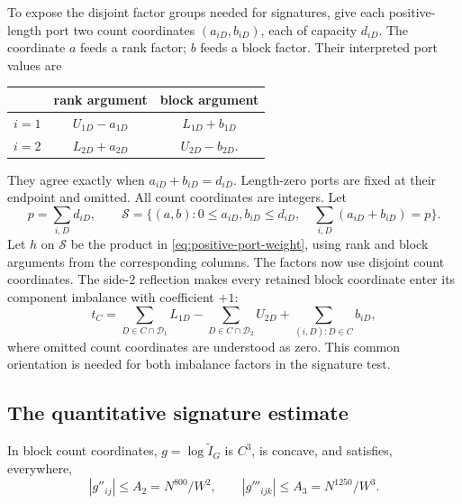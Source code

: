 To expose the disjoint factor groups needed for signatures, give each
positive-length port two count coordinates $(a_{iD},b_{iD})$, each of
capacity $d_{iD}$. The coordinate $a$ feeds a rank factor; $b$ feeds a
block factor. Their interpreted port values are
\begin{center}
\begin{tabular}{c@{\qquad}cc}
 & rank argument & block argument\\ \hline
 $i=1$ & $U_{1D}-a_{1D}$ & $L_{1D}+b_{1D}$\\
 $i=2$ & $L_{2D}+a_{2D}$ & $U_{2D}-b_{2D}$.
\end{tabular}
\end{center}
They agree exactly when $a_{iD}+b_{iD}=d_{iD}$. Length-zero ports are
fixed at their endpoint and omitted. All count coordinates are integers. Let
\begin{equation}\label{eq:paired-count-slice}
 p=\sum_{i,D}d_{iD},\qquad
 \mathcal S=\{(a,b):0\le a_{iD},b_{iD}\le d_{iD},\quad
                         \sum_{i,D}(a_{iD}+b_{iD})=p\}.
\end{equation}
Let $h$ on $\mathcal S$ be the product in
\eqref{eq:positive-port-weight}, using rank and block arguments from the
corresponding columns. The factors now use disjoint count coordinates.
The side-2 reflection makes every retained block coordinate enter its
component imbalance with coefficient $+1$:
\[
 t_C=\sum_{D\in C\cap\mathcal D_1}L_{1D}
       -\sum_{D\in C\cap\mathcal D_2}U_{2D}
       +\sum_{(i,D):D\in C}b_{iD},
\]
where omitted count coordinates are understood as zero. This common
orientation is needed for both imbalance factors in the signature test.

\subsection{The quantitative signature estimate}

\begin{lemma}\label{lem:smooth-derivatives}
In block count coordinates, $g=\log\widetilde I_G$ is $C^3$, is concave,
and satisfies, everywhere,
\begin{equation}\label{eq:smooth-derivative-bounds}
 |g''_{ij}|\le A_2=N^{800}/W^2,\qquad
 |g'''_{ijk}|\le A_3=N^{1250}/W^3.
\end{equation}
\end{lemma}

